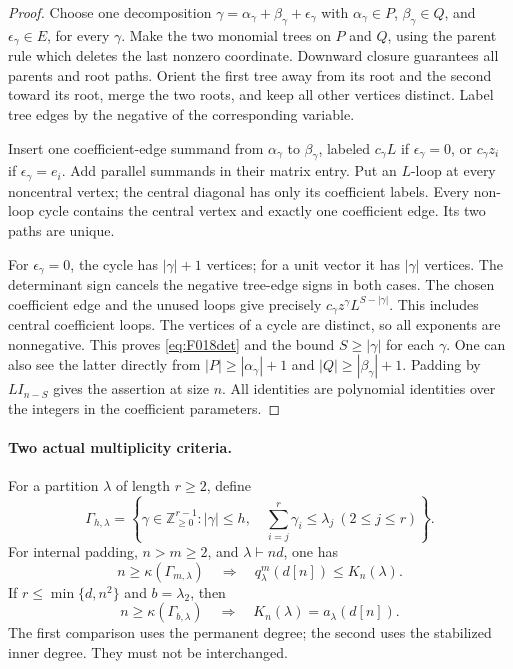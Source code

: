 \begin{proof}
Choose one decomposition
\(\gamma=\alpha_\gamma+\beta_\gamma+\epsilon_\gamma\)
with \(\alpha_\gamma\in P\), \(\beta_\gamma\in Q\), and
\(\epsilon_\gamma\in E\), for every \(\gamma\).
Make the two monomial trees on \(P\) and \(Q\), using
the parent rule which deletes the last nonzero coordinate.
Downward closure guarantees all parents and root paths.
Orient the first tree away from its root and the second
toward its root, merge the two roots, and keep all other
vertices distinct. Label tree edges by the negative of the
corresponding variable.

Insert one coefficient-edge summand from \(\alpha_\gamma\)
to \(\beta_\gamma\), labeled \(c_\gamma L\) if
\(\epsilon_\gamma=0\), or \(c_\gamma z_i\) if
\(\epsilon_\gamma=e_i\). Add parallel summands in their
matrix entry. Put an \(L\)-loop at every noncentral
vertex; the central diagonal has only its coefficient labels.
Every non-loop cycle contains the central vertex and exactly
one coefficient edge. Its two paths are unique.

For \(\epsilon_\gamma=0\), the cycle has
\(|\gamma|+1\) vertices; for a unit vector it has
\(|\gamma|\) vertices. The determinant sign cancels the
negative tree-edge signs in both cases. The chosen coefficient
edge and the unused loops give precisely
\(c_\gamma z^\gamma L^{S-|\gamma|}\). This includes
central coefficient loops. The vertices of a cycle are
distinct, so all exponents are nonnegative. This proves
\eqref{eq:F018det} and the bound \(S\geq|\gamma|\)
for each \(\gamma\). One can also see the latter directly
from \(|P|\geq|\alpha_\gamma|+1\) and
\(|Q|\geq|\beta_\gamma|+1\).
Padding by \(L I_{n-S}\) gives the assertion at size \(n\).
All identities are polynomial identities over the integers
in the coefficient parameters.
\end{proof}

\paragraph{Two actual multiplicity criteria.}
For a partition \(\lambda\) of length \(r\geq2\), define
\[
 \Gamma_{h,\lambda}=
 \left\{\gamma\in\mathbb Z_{\geq0}^{r-1}:|\gamma|\leq h,
      \quad\sum_{i=j}^r\gamma_i\leq\lambda_j
                                      \ (2\leq j\leq r)\right\}.
\]
For internal padding, \(n>m\geq2\), and
\(\lambda\vdash nd\), one has
\begin{equation}\label{eq:F018q}
 n\geq\kappa(\Gamma_{m,\lambda})
       \quad\Longrightarrow\quad q^m_\lambda(d[n])\leq K_n(\lambda).
\end{equation}
If \(r\leq\min\{d,n^2\}\) and \(b=\lambda_2\), then
\begin{equation}\label{eq:F018K}
 n\geq\kappa(\Gamma_{b,\lambda})
       \quad\Longrightarrow\quad K_n(\lambda)=a_\lambda(d[n]).
\end{equation}
The first comparison uses the permanent degree; the second
uses the stabilized inner degree. They must not be interchanged.

